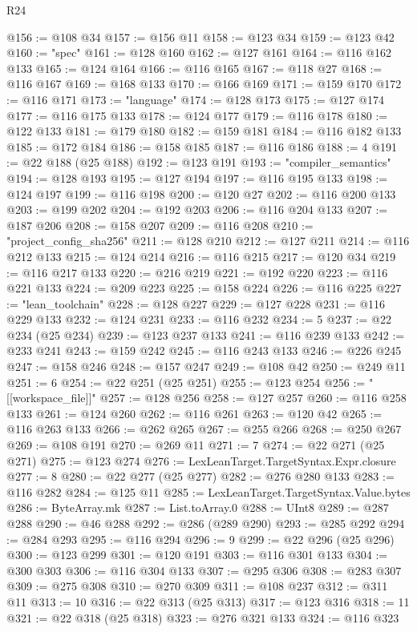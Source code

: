 \begin{lexlean}{R24}
\begin{coremodule}
{{{{{{{{{{{{{{{{{{{{{{{{{{{{{{{{{{{{{{{{{{{{{{{{{{{{{{{{{{{{{{{{{{{{{{{{{{{{{{{{{{{{{{{{{{{{{{{{{{{{{{{{{{{{{{{{{{{{{{{{{{{{{{{{{{{{{{{{{{{{{{{{{{{{{{{{{{{{{{{{{{{{{{{{{{{{{{{{{{{{{{{{{{{{{{{{{{{@156 := @108 @34
@157 := @156 @11
@158 := @123 @34
@159 := @123 @42
@160 := "spec"
@161 := @128 @160
@162 := @127 @161
@164 := @116 @162 @133
@165 := @124 @164
@166 := @116 @165
@167 := @118 @27
@168 := @116 @167
@169 := @168 @133
@170 := @166 @169
@171 := @159 @170
@172 := @116 @171
@173 := "language"
@174 := @128 @173
@175 := @127 @174
@177 := @116 @175 @133
@178 := @124 @177
@179 := @116 @178
@180 := @122 @133
@181 := @179 @180
@182 := @159 @181
@184 := @116 @182 @133
@185 := @172 @184
@186 := @158 @185
@187 := @116 @186
@188 := 4
@191 := @22 @188 (@25 @188)
@192 := @123 @191
@193 := "compiler_semantics"
@194 := @128 @193
@195 := @127 @194
@197 := @116 @195 @133
@198 := @124 @197
@199 := @116 @198
@200 := @120 @27
@202 := @116 @200 @133
@203 := @199 @202
@204 := @192 @203
@206 := @116 @204 @133
@207 := @187 @206
@208 := @158 @207
@209 := @116 @208
@210 := "project_config_sha256"
@211 := @128 @210
@212 := @127 @211
@214 := @116 @212 @133
@215 := @124 @214
@216 := @116 @215
@217 := @120 @34
@219 := @116 @217 @133
@220 := @216 @219
@221 := @192 @220
@223 := @116 @221 @133
@224 := @209 @223
@225 := @158 @224
@226 := @116 @225
@227 := "lean_toolchain"
@228 := @128 @227
@229 := @127 @228
@231 := @116 @229 @133
@232 := @124 @231
@233 := @116 @232
@234 := 5
@237 := @22 @234 (@25 @234)
@239 := @123 @237 @133
@241 := @116 @239 @133
@242 := @233 @241
@243 := @159 @242
@245 := @116 @243 @133
@246 := @226 @245
@247 := @158 @246
@248 := @157 @247
@249 := @108 @42
@250 := @249 @11
@251 := 6
@254 := @22 @251 (@25 @251)
@255 := @123 @254
@256 := "[[workspace_file]]"
@257 := @128 @256
@258 := @127 @257
@260 := @116 @258 @133
@261 := @124 @260
@262 := @116 @261
@263 := @120 @42
@265 := @116 @263 @133
@266 := @262 @265
@267 := @255 @266
@268 := @250 @267
@269 := @108 @191
@270 := @269 @11
@271 := 7
@274 := @22 @271 (@25 @271)
@275 := @123 @274
@276 := LexLeanTarget.TargetSyntax.Expr.closure
@277 := 8
@280 := @22 @277 (@25 @277)
@282 := @276 @280 @133
@283 := @116 @282
@284 := @125 @11
@285 := LexLeanTarget.TargetSyntax.Value.bytes
@286 := ByteArray.mk
@287 := List.toArray.{0}
@288 := UInt8
@289 := @287 @288
@290 := @46 @288
@292 := @286 (@289 @290)
@293 := @285 @292
@294 := @284 @293
@295 := @116 @294
@296 := 9
@299 := @22 @296 (@25 @296)
@300 := @123 @299
@301 := @120 @191
@303 := @116 @301 @133
@304 := @300 @303
@306 := @116 @304 @133
@307 := @295 @306
@308 := @283 @307
@309 := @275 @308
@310 := @270 @309
@311 := @108 @237
@312 := @311 @11
@313 := 10
@316 := @22 @313 (@25 @313)
@317 := @123 @316
@318 := 11
@321 := @22 @318 (@25 @318)
@323 := @276 @321 @133
@324 := @116 @323
}}}}}}}}}}}}}}}}}}}}}}}}}}}}}}}}}}}}}}}}}}}}}}}}}}}}}}}}}}}}}}}}}}}}}}}}}}}}}}}}}}}}}}}}}}}}}}}}}}}}}}}}}}}}}}}}}}}}}}}}}}}}}}}}}}}}}}}}}}}}}}}}}}}}}}}}}}}}}}}}}}}}}}}}}}}}}}}}}}}}}}}}}}}}}}}}}}}
\end{coremodule}
\end{lexlean}
